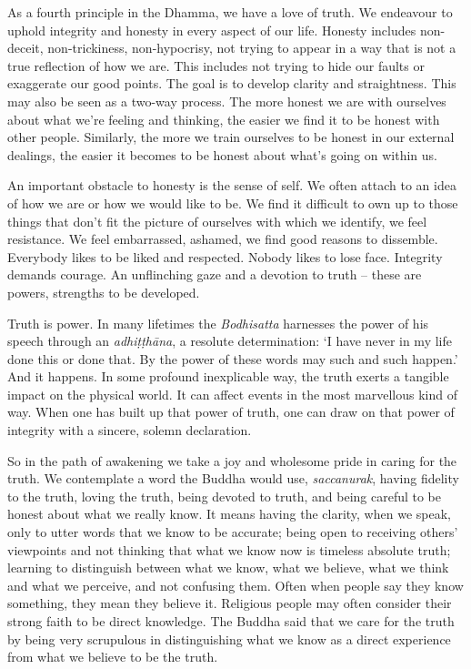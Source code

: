 As a fourth principle in the Dhamma, we have a love of truth. We
endeavour to uphold integrity and honesty in every aspect of our life. 
Honesty includes non-deceit, non-trickiness, non-hypocrisy, not trying
to appear in a way that is not a true reflection of how we are. This
includes not trying to hide our faults or exaggerate our good points. 
The goal is to develop clarity and straightness. This may also be seen
as a two-way process. The more honest we are with ourselves about what
we're feeling and thinking, the easier we find it to be honest with
other people. Similarly, the more we train ourselves to be honest in our
external dealings, the easier it becomes to be honest about what's going
on within us. 

An important obstacle to honesty is the sense of self. We often attach
to an idea of how we are or how we would like to be. We find it
difficult to own up to those things that don't fit the picture of
ourselves with which we identify, we feel resistance. We feel
embarrassed, ashamed, we find good reasons to dissemble. Everybody likes
to be liked and respected. Nobody likes to lose face. Integrity demands
courage. An unflinching gaze and a devotion to truth -- these are
powers, strengths to be developed. 

Truth is power. In many lifetimes the \emph{Bodhisatta} harnesses the
power of his speech through an \emph{adhiṭṭhāna}, a resolute
determination: `I have never in my life done this or done that. By the
power of these words may such and such happen.' And it happens. In some
profound inexplicable way, the truth exerts a tangible impact on the
physical world. It can affect events in the most marvellous kind of way. 
When one has built up that power of truth, one can draw on that power of
integrity with a sincere, solemn declaration. 

So in the path of awakening we take a joy and wholesome pride in caring
for the truth. We contemplate a word the Buddha would use, 
\emph{saccanurak}, having fidelity to the truth, loving the truth, being
devoted to truth, and being careful to be honest about what we really
know. It means having the clarity, when we speak, only to utter words
that we know to be accurate; being open to receiving others' viewpoints
and not thinking that what we know now is timeless absolute truth; 
learning to distinguish between what we know, what we believe, what we
think and what we perceive, and not confusing them. Often when people
say they know something, they mean they believe it. Religious people may
often consider their strong faith to be direct knowledge. The Buddha
said that we care for the truth by being very scrupulous in
distinguishing what we know as a direct experience from what we believe
to be the truth. 

